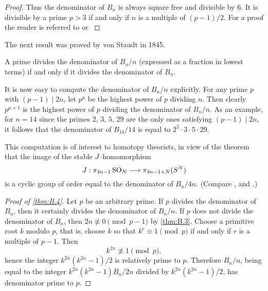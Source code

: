 \documentclass[../main]{subfiles}
\begin{document}
\begin{proof}
Thus the denominator of $B_n$ is always square free and divisible by $6$. It is divisible by a prime $p > 3$ if and only if $n$ is a multiple of $(p - 1)/2$. For a proof the reader is referred to \cite[Section 7.10]{hardy2008introduction} or \cite[p. 384]{borevich1966}
\end{proof}

The next result was proved by von Staudt in 1845.

\begin{theorem}
\label{thm:B.4}
A prime divides the denominator of $B_n/n$ (expressed as a fraction in lowest terms) if and only if it divides the denominator of $B_n$. 
\end{theorem}

It is now easy to compute the denominator of $B_n/n$ explicitly. For any prime $p$ with $(p - 1) \mid 2n$, let $p^\mu$ be the highest power of $p$ dividing $n$. Then clearly $p^{\mu + 1}$ is the highest power of $p$ dividing the denominator of $B_n/n$. As an example, for $n = 14$ since the primes $2, \, 3, \, 5, \, 29$ are the only ones satisfying $(p - 1) \mid 2n$, it follows that the denominator of $B_{14}/14$ is equal to $2^2 \cdot 3 \cdot 5 \cdot 29$. 

\begin{remark*}
This computation is of interest to homotopy theorists, in view of the theorem that the image of the stable $J$--homomorphism \[J : \pi_{4n - 1} \operatorname{SO}_N \longrightarrow \pi_{4n - 1 + N} (S^N)\] is a cyclic group of order equal to the denominator of $B_n/4n$. (Compare \cite{kervaire-milnor}, \cite{adams1965} and \cite{mahowald}.)
\end{remark*}

\begin{proof}[Proof of \ref{thm:B.4}]
Let $p$ be an arbitrary prime. If $p$ divides the denominator of $B_n$, then it certainly divides the denominator of $B_n/n$. If $p$ does not divide the denominator of $B_n$, then $2n \not\equiv 0 \pmod {p - 1}$ by \ref{thm:B.3}. Choose a primitive root $k$ modulo $p$, that is, choose $k$ so that $k^r \equiv 1 \pmod p$ if and only if $r$ is a multiple of $p - 1$. Then \[k^{2n} \not\equiv 1 \pmod p,\] hence the integer $k^{2n}(k^{2n} - 1)/2$ is relatively prime to $p$. Therefore $B_n/n$, being equal to the integer $k^{2n}(k^{2n} - 1)B_n/2n$ divided by $k^{2n}(k^{2n} - 1)/2$, has denominator prime to $p$. 
\end{proof}
\end{document}
